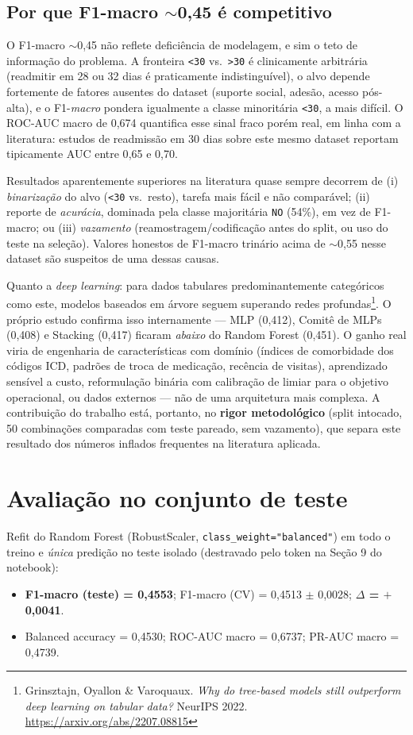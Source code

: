 \documentclass[12pt,a4paper]{article}
\begin{document}
\subsection{Por que F1-macro $\sim$0,45 é competitivo}
O F1-macro $\sim$0,45 não reflete deficiência de modelagem, e sim o teto de informação do problema. A fronteira \texttt{<30} vs.\ \texttt{>30} é clinicamente arbitrária (readmitir em 28 ou 32 dias é praticamente indistinguível), o alvo depende fortemente de fatores ausentes do dataset (suporte social, adesão, acesso pós-alta), e o F1-\emph{macro} pondera igualmente a classe minoritária \texttt{<30}, a mais difícil. O ROC-AUC macro de 0{,}674 quantifica esse sinal fraco porém real, em linha com a literatura: estudos de readmissão em 30 dias sobre este mesmo dataset reportam tipicamente AUC entre 0{,}65 e 0{,}70.

Resultados aparentemente superiores na literatura quase sempre decorrem de (i) \emph{binarização} do alvo (\texttt{<30} vs.\ resto), tarefa mais fácil e não comparável; (ii) reporte de \emph{acurácia}, dominada pela classe majoritária \texttt{NO} (54\%), em vez de F1-macro; ou (iii) \emph{vazamento} (reamostragem/codificação antes do split, ou uso do teste na seleção). Valores honestos de F1-macro trinário acima de $\sim$0{,}55 nesse dataset são suspeitos de uma dessas causas.

Quanto a \emph{deep learning}: para dados tabulares predominantemente categóricos como este, modelos baseados em árvore seguem superando redes profundas\footnote{Grinsztajn, Oyallon \& Varoquaux. \emph{Why do tree-based models still outperform deep learning on tabular data?} NeurIPS 2022. \url{https://arxiv.org/abs/2207.08815}}. O próprio estudo confirma isso internamente --- MLP (0{,}412), Comitê de MLPs (0{,}408) e Stacking (0{,}417) ficaram \emph{abaixo} do Random Forest (0{,}451). O ganho real viria de engenharia de características com domínio (índices de comorbidade dos códigos ICD, padrões de troca de medicação, recência de visitas), aprendizado sensível a custo, reformulação binária com calibração de limiar para o objetivo operacional, ou dados externos --- não de uma arquitetura mais complexa. A contribuição do trabalho está, portanto, no \textbf{rigor metodológico} (split intocado, 50 combinações comparadas com teste pareado, sem vazamento), que separa este resultado dos números inflados frequentes na literatura aplicada.

\section{Avaliação no conjunto de teste}
Refit do Random Forest (RobustScaler, \texttt{class\_weight="balanced"}) em todo o treino e \emph{única} predição no teste isolado (destravado pelo token na Seção 9 do notebook):
\begin{itemize}
  \item \textbf{F1-macro (teste) = 0{,}4553}; F1-macro (CV) = 0{,}4513 $\pm$ 0{,}0028; \textbf{$\Delta$ = $+$0{,}0041}.
  \item Balanced accuracy = 0{,}4530; ROC-AUC macro = 0{,}6737; PR-AUC macro = 0{,}4739.
\end{itemize}
\end{document}
